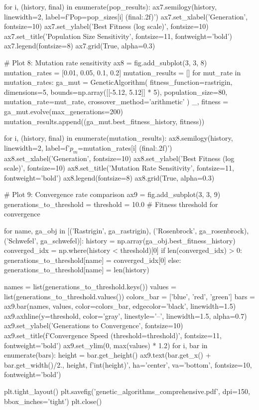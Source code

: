 \documentclass[a4paper, 11pt]{article}
\begin{document}
\begin{pycode}
for i, (history, final) in enumerate(pop_results):
    ax7.semilogy(history, linewidth=2, label=f'Pop={pop_sizes[i]} ({final:.2f})')
ax7.set_xlabel('Generation', fontsize=10)
ax7.set_ylabel('Best Fitness (log scale)', fontsize=10)
ax7.set_title('Population Size Sensitivity', fontsize=11, fontweight='bold')
ax7.legend(fontsize=8)
ax7.grid(True, alpha=0.3)

# Plot 8: Mutation rate sensitivity
ax8 = fig.add_subplot(3, 3, 8)
mutation_rates = [0.01, 0.05, 0.1, 0.2]
mutation_results = []
for mut_rate in mutation_rates:
    ga_mut = GeneticAlgorithm(
        fitness_function=rastrigin,
        dimensions=5,
        bounds=np.array([[-5.12, 5.12]] * 5),
        population_size=80,
        mutation_rate=mut_rate,
        crossover_method='arithmetic'
    )
    _, fitness = ga_mut.evolve(max_generations=200)
    mutation_results.append((ga_mut.best_fitness_history, fitness))

for i, (history, final) in enumerate(mutation_results):
    ax8.semilogy(history, linewidth=2,
                 label=f'$p_m$={mutation_rates[i]} ({final:.2f})')
ax8.set_xlabel('Generation', fontsize=10)
ax8.set_ylabel('Best Fitness (log scale)', fontsize=10)
ax8.set_title('Mutation Rate Sensitivity', fontsize=11, fontweight='bold')
ax8.legend(fontsize=8)
ax8.grid(True, alpha=0.3)

# Plot 9: Convergence rate comparison
ax9 = fig.add_subplot(3, 3, 9)
generations_to_threshold = {}
threshold = 10.0  # Fitness threshold for convergence

for name, ga_obj in [('Rastrigin', ga_rastrigin),
                      ('Rosenbrock', ga_rosenbrock),
                      ('Schwefel', ga_schwefel)]:
    history = np.array(ga_obj.best_fitness_history)
    converged_idx = np.where(history < threshold)[0]
    if len(converged_idx) > 0:
        generations_to_threshold[name] = converged_idx[0]
    else:
        generations_to_threshold[name] = len(history)

names = list(generations_to_threshold.keys())
values = list(generations_to_threshold.values())
colors_bar = ['blue', 'red', 'green']
bars = ax9.bar(names, values, color=colors_bar, edgecolor='black', linewidth=1.5)
ax9.axhline(y=threshold, color='gray', linestyle='--', linewidth=1.5, alpha=0.7)
ax9.set_ylabel('Generations to Convergence', fontsize=10)
ax9.set_title(f'Convergence Speed (threshold={threshold})', fontsize=11, fontweight='bold')
ax9.set_ylim(0, max(values) * 1.2)
for i, bar in enumerate(bars):
    height = bar.get_height()
    ax9.text(bar.get_x() + bar.get_width()/2., height,
             f'{int(height)}', ha='center', va='bottom', fontsize=10, fontweight='bold')

plt.tight_layout()
plt.savefig('genetic_algorithms_comprehensive.pdf', dpi=150, bbox_inches='tight')
plt.close()
\end{pycode}
\end{document}
